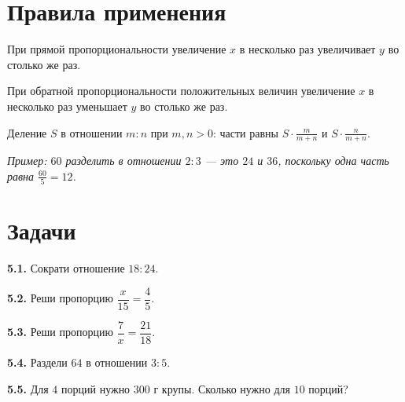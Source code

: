 \section{Правила применения}
При прямой пропорциональности увеличение \(x\) в несколько раз увеличивает \(y\) во столько же раз.\par
При обратной пропорциональности положительных величин увеличение \(x\) в несколько раз уменьшает \(y\) во столько же раз.\par
Деление \(S\) в отношении \(m : n\) при \(m,\allowbreak n > 0\): части равны \(S \cdot  \frac{m}{m + n}\) и \(S \cdot  \frac{n}{m + n}\).\par
{\small\textit{Пример: \(60\) разделить в отношении \(2 : 3\) — это \(24\) и \(36\), поскольку одна часть равна \(\frac{60}{5} = 12\).}}\par
{}\section*{Задачи}
\begingroup\setlength{\parskip}{1pt}
\noindent\begin{minipage}[t]{\linewidth}\textbf{5.1.} Сократи отношение \(18 : 24\).\par\end{minipage}\par
\noindent\begin{minipage}[t]{\linewidth}\textbf{5.2.} Реши пропорцию \(\dfrac{x}{15} = \dfrac{4}{5}\).\par\end{minipage}\par
\noindent\begin{minipage}[t]{\linewidth}\textbf{5.3.} Реши пропорцию \(\dfrac{7}{x} = \dfrac{21}{18}\).\par\end{minipage}\par
\noindent\begin{minipage}[t]{\linewidth}\textbf{5.4.} Раздели \(64\) в отношении \(3 : 5\).\par\end{minipage}\par
\noindent\begin{minipage}[t]{\linewidth}\textbf{5.5.} Для \(4\) порций нужно \(300\) г крупы. Сколько нужно для \(10\) порций?\par\end{minipage}\par
